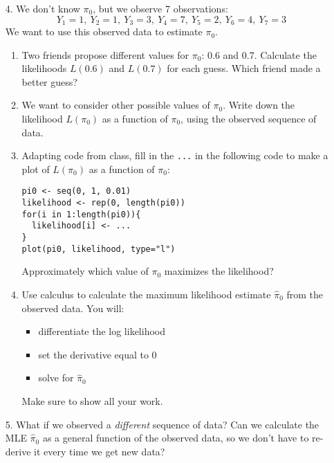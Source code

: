 \documentclass[11pt]{article}
\begin{document}
\begin{enumerate}
\item[4.] We don't know $\pi_0$, but we observe 7 observations:
$$Y_1 = 1, \ Y_2 = 1, \ Y_3 = 3, \ Y_4 = 7, \ Y_5 = 2, \ Y_6 = 4, \ Y_7 = 3$$
We want to use this observed data to estimate $\pi_0$.

\begin{enumerate}
\item Two friends propose different values for $\pi_0$: 0.6 and 0.7. Calculate the likelihoods $L(0.6)$ and $L(0.7)$ for each guess. Which friend made a better guess?

\item We want to consider other possible values of $\pi_0$. Write down the likelihood $L(\pi_0)$ as a function of $\pi_0$, using the observed sequence of data.

\item Adapting code from class, fill in the \verb;...; in the following code to make a plot of $L(\pi_0)$ as a function of $\pi_0$:

\begin{verbatim}
pi0 <- seq(0, 1, 0.01) 
likelihood <- rep(0, length(pi0))
for(i in 1:length(pi0)){
  likelihood[i] <- ...
}
plot(pi0, likelihood, type="l")
\end{verbatim}

Approximately which value of $\pi_0$ maximizes the likelihood?

\item Use calculus to calculate the maximum likelihood estimate $\widehat{\pi}_0$ from the observed data. You will:
\begin{itemize}
\item differentiate the log likelihood
\item set the derivative equal to 0
\item solve for $\widehat{\pi}_0$
\end{itemize}
Make sure to show all your work.
\end{enumerate}

\item[5.] What if we observed a \textit{different} sequence of data? Can we calculate the MLE $\widehat{\pi}_0$ as a general function of the observed data, so we don't have to re-derive it every time we get new data?\\


\end{enumerate}
\end{document}
